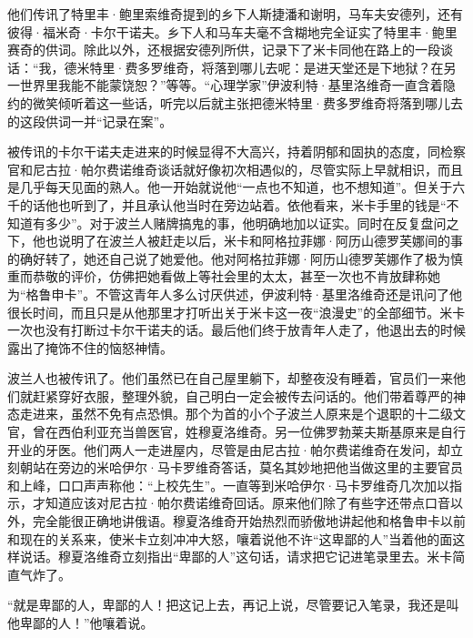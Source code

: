 \par 他们传讯了特里丰·鲍里索维奇提到的乡下人斯捷潘和谢明，马车夫安德列，还有彼得·福米奇·卡尔干诺夫。乡下人和马车夫毫不含糊地完全证实了特里丰·鲍里赛奇的供词。除此以外，还根据安德列所供，记录下了米卡同他在路上的一段谈话：“我，德米特里·费多罗维奇，将落到哪儿去呢：是进天堂还是下地狱？在另一世界里我能不能蒙饶恕？”等等。“心理学家”伊波利特·基里洛维奇一直含着隐约的微笑倾听着这一些话，听完以后就主张把德米特里·费多罗维奇将落到哪儿去的这段供词一并“记录在案”。
\par 被传讯的卡尔干诺夫走进来的时候显得不大高兴，持着阴郁和固执的态度，同检察官和尼古拉·帕尔费诺维奇谈话就好像初次相遇似的，尽管实际上早就相识，而且是几乎每天见面的熟人。他一开始就说他“一点也不知道，也不想知道”。但关于六千的话他也听到了，并且承认他当时在旁边站着。依他看来，米卡手里的钱是“不知道有多少”。对于波兰人赌牌搞鬼的事，他明确地加以证实。同时在反复盘问之下，他也说明了在波兰人被赶走以后，米卡和阿格拉菲娜·阿历山德罗芙娜间的事的确好转了，她还自己说了她爱他。他对阿格拉菲娜·阿历山德罗芙娜作了极为慎重而恭敬的评价，仿佛把她看做上等社会里的太太，甚至一次也不肯放肆称她为“格鲁申卡”。不管这青年人多么讨厌供述，伊波利特·基里洛维奇还是讯问了他很长时间，而且只是从他那里才打听出关于米卡这一夜“浪漫史”的全部细节。米卡一次也没有打断过卡尔干诺夫的话。最后他们终于放青年人走了，他退出去的时候露出了掩饰不住的恼怒神情。
\par 波兰人也被传讯了。他们虽然已在自己屋里躺下，却整夜没有睡着，官员们一来他们就赶紧穿好衣服，整理外貌，自己明白一定会被传去问话的。他们带着尊严的神态走进来，虽然不免有点恐惧。那个为首的小个子波兰人原来是个退职的十二级文官，曾在西伯利亚充当兽医官，姓穆夏洛维奇。另一位佛罗勃莱夫斯基原来是自行开业的牙医。他们两人一走进屋内，尽管是由尼古拉·帕尔费诺维奇在发问，却立刻朝站在旁边的米哈伊尔·马卡罗维奇答话，莫名其妙地把他当做这里的主要官员和上峰，口口声声称他：“上校先生”。一直等到米哈伊尔·马卡罗维奇几次加以指示，才知道应该对尼古拉·帕尔费诺维奇回话。原来他们除了有些字还带点口音以外，完全能很正确地讲俄语。穆夏洛维奇开始热烈而骄傲地讲起他和格鲁申卡以前和现在的关系来，使米卡立刻冲冲大怒，嚷着说他不许“这卑鄙的人”当着他的面这样说话。穆夏洛维奇立刻指出“卑鄙的人”这句话，请求把它记进笔录里去。米卡简直气炸了。
\par “就是卑鄙的人，卑鄙的人！把这记上去，再记上说，尽管要记入笔录，我还是叫他卑鄙的人！”他嚷着说。
